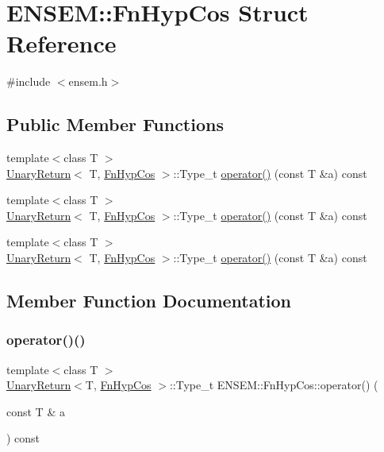 \hypertarget{structENSEM_1_1FnHypCos}{}\section{E\+N\+S\+EM\+:\+:Fn\+Hyp\+Cos Struct Reference}
\label{structENSEM_1_1FnHypCos}


{\ttfamily \#include $<$ensem.\+h$>$}

\subsection*{Public Member Functions}
\begin{DoxyCompactItemize}
\item 
{\footnotesize template$<$class T $>$ }\\\mbox{\hyperlink{structENSEM_1_1UnaryReturn}{Unary\+Return}}$<$ T, \mbox{\hyperlink{structENSEM_1_1FnHypCos}{Fn\+Hyp\+Cos}} $>$\+::Type\+\_\+t \mbox{\hyperlink{structENSEM_1_1FnHypCos_abc3e4d24871bdf77186ed9f57adfcf1c}{operator()}} (const T \&a) const
\item 
{\footnotesize template$<$class T $>$ }\\\mbox{\hyperlink{structENSEM_1_1UnaryReturn}{Unary\+Return}}$<$ T, \mbox{\hyperlink{structENSEM_1_1FnHypCos}{Fn\+Hyp\+Cos}} $>$\+::Type\+\_\+t \mbox{\hyperlink{structENSEM_1_1FnHypCos_abc3e4d24871bdf77186ed9f57adfcf1c}{operator()}} (const T \&a) const
\item 
{\footnotesize template$<$class T $>$ }\\\mbox{\hyperlink{structENSEM_1_1UnaryReturn}{Unary\+Return}}$<$ T, \mbox{\hyperlink{structENSEM_1_1FnHypCos}{Fn\+Hyp\+Cos}} $>$\+::Type\+\_\+t \mbox{\hyperlink{structENSEM_1_1FnHypCos_abc3e4d24871bdf77186ed9f57adfcf1c}{operator()}} (const T \&a) const
\end{DoxyCompactItemize}


\subsection{Member Function Documentation}
\mbox{\label{structENSEM_1_1FnHypCos_abc3e4d24871bdf77186ed9f57adfcf1c}} 
\subsubsection{\texorpdfstring{operator()()}{operator()()}\hspace{0.1cm}{\footnotesize\ttfamily [1/3]}}
{\footnotesize\ttfamily template$<$class T $>$ \\
\mbox{\hyperlink{structENSEM_1_1UnaryReturn}{Unary\+Return}}$<$T, \mbox{\hyperlink{structENSEM_1_1FnHypCos}{Fn\+Hyp\+Cos}} $>$\+::Type\+\_\+t E\+N\+S\+E\+M\+::\+Fn\+Hyp\+Cos\+::operator() (\begin{DoxyParamCaption}\item[{const T \&}]{a }\end{DoxyParamCaption}) const\hspace{0.3cm}{\ttfamily [inline]}}

